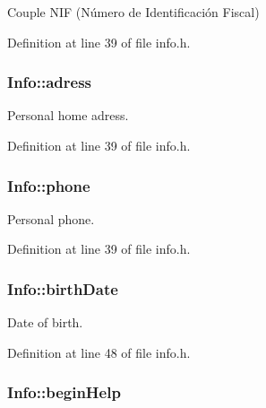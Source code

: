 Couple N\+I\+F (Número de Identificación Fiscal) 



Definition at line 39 of file info.\+h.

\hypertarget{struct_info_ad06b1d7b878c03e41bf30efb34dfbdf6}{
\subsubsection[{adress}]{\setlength{\rightskip}{0pt plus 5cm}Info\+::adress}}\label{struct_info_ad06b1d7b878c03e41bf30efb34dfbdf6}


Personal home adress. 



Definition at line 39 of file info.\+h.

\hypertarget{struct_info_a112f47a5e74f513da22e17d78dd9979a}{
\subsubsection[{phone}]{\setlength{\rightskip}{0pt plus 5cm}Info\+::phone}}\label{struct_info_a112f47a5e74f513da22e17d78dd9979a}


Personal phone. 



Definition at line 39 of file info.\+h.

\hypertarget{struct_info_a3c37c78a0e01a9b8871adddce7451e53}{
\subsubsection[{birth\+Date}]{\setlength{\rightskip}{0pt plus 5cm}Info\+::birth\+Date}}\label{struct_info_a3c37c78a0e01a9b8871adddce7451e53}


Date of birth. 



Definition at line 48 of file info.\+h.

\hypertarget{struct_info_a0b9f2e6014fe7a54993c36d15450b7e0}{
\subsubsection[{begin\+Help}]{\setlength{\rightskip}{0pt plus 5cm}Info\+::begin\+Help}}\label{struct_info_a0b9f2e6014fe7a54993c36d15450b7e0}


